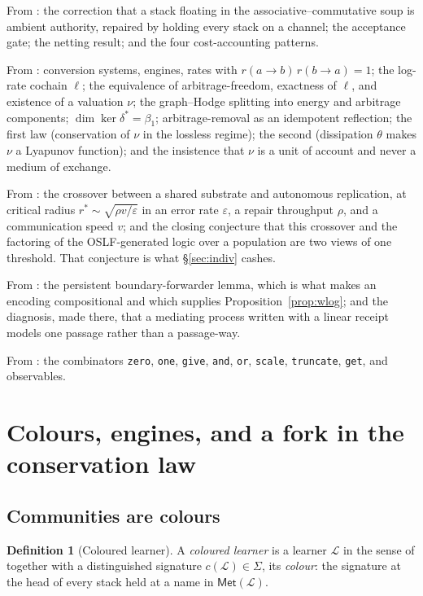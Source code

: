 \documentclass[11pt]{article}
\theoremstyle{plain}
\theoremstyle{definition}
\newtheorem{definition}[theorem]{Definition}
\theoremstyle{remark}
\newcommand{\Lrn}{\mathcal{L}}
\newcommand{\Met}{\mathsf{Met}}
\newcommand{\Sig}{\Sigma}
\newcommand{\bt}{\beta_1}
\begin{document}
From \cite{finrho}: the correction that a stack floating in the
associative--commutative soup is ambient authority, repaired by holding
every stack on a channel; the acceptance gate; the netting result; and the
four cost-accounting patterns.

From \cite{vtok}: conversion systems, engines, rates with
$r(a{\to}b)\,r(b{\to}a) = 1$; the log-rate cochain $\ell$; the equivalence
of arbitrage-freedom, exactness of $\ell$, and existence of a valuation
$\nu$; the graph--Hodge splitting into energy and arbitrage components;
$\dim\ker\delta^\ast = \bt$; arbitrage-removal as an idempotent reflection;
the first law (conservation of $\nu$ in the lossless regime); the second
(dissipation $\theta$ makes $\nu$ a Lyapunov function); and the insistence
that $\nu$ is a unit of account and never a medium of exchange.

From \cite{compaut}: the crossover between a shared substrate and
autonomous replication, at critical radius $r^\ast \sim
\sqrt{\rho v / \varepsilon}$ in an error rate $\varepsilon$, a repair
throughput $\rho$, and a communication speed $v$; and the closing
conjecture that this crossover and the factoring of the OSLF-generated
logic over a population are two views of one threshold. That conjecture is
what \S\ref{sec:indiv} cashes.

From \cite{knots}: the persistent boundary-forwarder lemma, which is what
makes an encoding compositional and which supplies
Proposition~\ref{prop:wlog}; and the diagnosis, made there, that a
mediating process written with a linear receipt models one passage rather
than a passage-way.

From \cite{SPJ2000}: the combinators \texttt{zero}, \texttt{one},
\texttt{give}, \texttt{and}, \texttt{or}, \texttt{scale},
\texttt{truncate}, \texttt{get}, and observables.

\section{Colours, engines, and a fork in the conservation law}
\label{sec:fork}

\subsection{Communities are colours}

\begin{definition}[Coloured learner]
A \emph{coloured learner} is a learner $\Lrn$ in the sense of
\cite[\S3]{compose} together with a distinguished signature
$c(\Lrn) \in \Sig$, its \emph{colour}: the signature at the head of every
stack held at a name in $\Met(\Lrn)$.
\end{definition}
\end{document}
